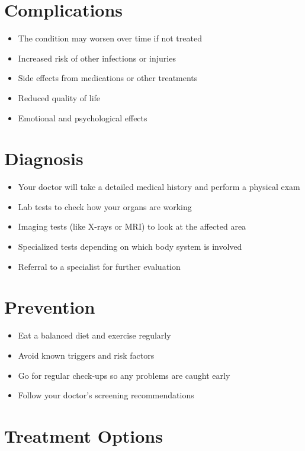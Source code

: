 \section{Complications}

\begin{itemize}[noitemsep]
  \item The condition may worsen over time if not treated
  \item Increased risk of other infections or injuries
  \item Side effects from medications or other treatments
  \item Reduced quality of life
  \item Emotional and psychological effects
\end{itemize}

\section{Diagnosis}

\begin{itemize}[noitemsep]
  \item Your doctor will take a detailed medical history and perform a physical exam
  \item Lab tests to check how your organs are working
  \item Imaging tests (like X-rays or MRI) to look at the affected area
  \item Specialized tests depending on which body system is involved
  \item Referral to a specialist for further evaluation
\end{itemize}

\section{Prevention}

\begin{itemize}[noitemsep]
  \item Eat a balanced diet and exercise regularly
  \item Avoid known triggers and risk factors
  \item Go for regular check-ups so any problems are caught early
  \item Follow your doctor's screening recommendations
\end{itemize}

\section{Treatment Options}


